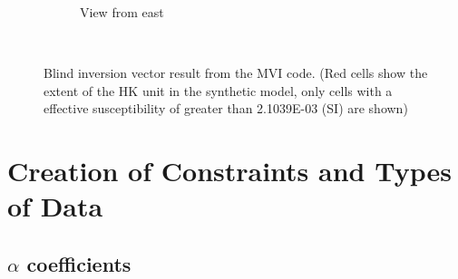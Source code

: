 \begin{figure}
\begin{subfigure}[b]{0.8\textwidth}
        \caption{View from east}
        \label{fig:blindMVIeastFld}
    \end{subfigure}
    ~ %
   \caption{Blind inversion vector result from the \ac{MVI} code. (Red cells show the extent of the HK unit in the synthetic model, only cells with a effective susceptibility of greater than 2.1039E-03 (SI) are shown)}
   \label{fig:blindMVIFld}
\end{figure}




%
%
%
%
%

\section{Creation of Constraints and Types of Data}
\label{sec:Creation of Constraints:TKC}




\subsection{$\alpha$ coefficients}
\label{sec:alpha coefficients:TKC}


